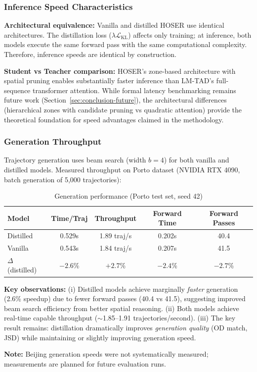 \subsubsection{Inference Speed Characteristics}

\textbf{Architectural equivalence:} Vanilla and distilled HOSER use identical architectures. The distillation loss ($\lambda \mathcal{L}_{\text{KL}}$) affects only training; at inference, both models execute the same forward pass with the same computational complexity. Therefore, inference speeds are identical by construction.

\textbf{Student vs Teacher comparison:} HOSER's zone-based architecture with spatial pruning enables substantially faster inference than LM-TAD's full-sequence transformer attention. While formal latency benchmarking remains future work (Section~\ref{sec:conclusion-future}), the architectural differences (hierarchical zones with candidate pruning vs quadratic attention) provide the theoretical foundation for speed advantages claimed in the methodology.

\subsubsection{Generation Throughput}

Trajectory generation uses beam search (width $b=4$) for both vanilla and distilled models. Measured throughput on Porto dataset (NVIDIA RTX 4090, batch generation of 5,000 trajectories):

\begin{table}[h]
    \centering
    \caption{Generation performance (Porto test set, seed 42)}
    \label{tab:generation-perf}
    \small
    \begin{tabular}{lcccc}
        \toprule
        \textbf{Model}      & \textbf{Time/Traj} & \textbf{Throughput} & \textbf{Forward Time} & \textbf{Forward Passes} \\
        \midrule
        Distilled           & 0.529s             & 1.89 traj/s         & 0.202s                & 40.4                    \\
        Vanilla             & 0.543s             & 1.84 traj/s         & 0.207s                & 41.5                    \\
        $\Delta$ (distilled) & $-2.6$\%           & $+2.7$\%            & $-2.4$\%              & $-2.7$\%                \\
        \bottomrule
    \end{tabular}
\end{table}

\textbf{Key observations:} (i) Distilled models achieve marginally \emph{faster} generation (2.6\% speedup) due to fewer forward passes (40.4 vs 41.5), suggesting improved beam search efficiency from better spatial reasoning. (ii) Both models achieve real-time capable throughput ($\sim$1.85--1.91 trajectories/second). (iii) The key result remains: distillation dramatically improves \emph{generation quality} (OD match, JSD) while maintaining or slightly improving generation speed.

\textbf{Note:} Beijing generation speeds were not systematically measured; measurements are planned for future evaluation runs.


